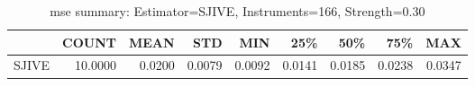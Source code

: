 \begin{table}[ht]
\centering
\caption{mse summary: Estimator=SJIVE, Instruments=166, Strength=0.30}
\begin{tabular}{lrrrrrrrr}
\toprule
 & COUNT & MEAN & STD & MIN & 25\% & 50\% & 75\% & MAX \\
\midrule
SJIVE & 10.0000 & 0.0200 & 0.0079 & 0.0092 & 0.0141 & 0.0185 & 0.0238 & 0.0347 \\
\bottomrule
\end{tabular}
\end{table}
